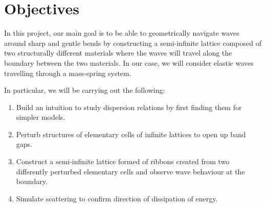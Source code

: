 \section{Objectives}
In this project, our main goal is to be able to geometrically navigate waves
around sharp and gentle bends by constructing a semi-infinite lattice composed
of two structurally different materials where the waves will travel along the
boundary between the two materials. In our case, we will consider elastic waves
travelling through a mass-spring system.

In particular, we will be carrying out the following:

\begin{enumerate}
\item Build an intuition to study dispersion relations by first finding them
      for simpler models.
\item Perturb structures of elementary cells of infinite lattices to open up
      band gaps.
\item Construct a semi-infinite lattice formed of ribbons created from two
      differently perturbed elementary cells and observe wave behaviour at the
      boundary.
\item Simulate scattering to confirm direction of dissipation of energy.
\end{enumerate}



